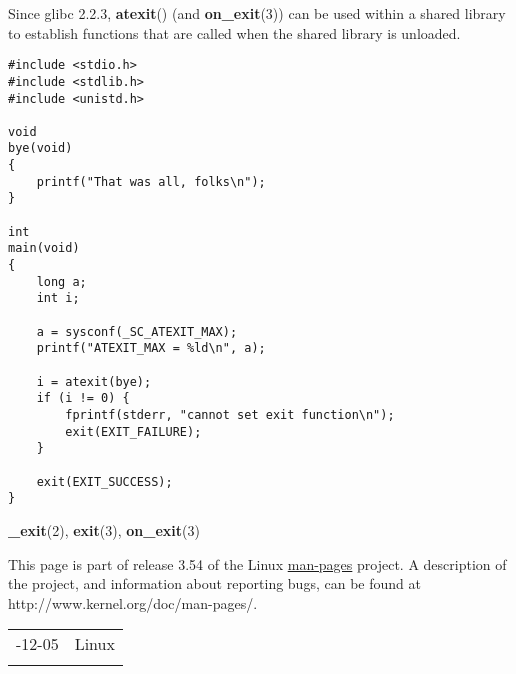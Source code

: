 \documentclass[]{article}
\let\realtextbf=\textbf
\renewcommand{\textbf}[1]{\textcolor{boldcolor}{\realtextbf{#1}}}
\renewcommand{\emph}[1]{\underline{#1}}
\begin{document}
Since glibc 2.2.3, \textbf{atexit}() (and \textbf{on\_exit}(3)) can be
used within a shared library to establish functions that are called when
the shared library is unloaded.


\begin{verbatim}
#include <stdio.h>
#include <stdlib.h>
#include <unistd.h>

void
bye(void)
{
    printf("That was all, folks\n");
}

int
main(void)
{
    long a;
    int i;

    a = sysconf(_SC_ATEXIT_MAX);
    printf("ATEXIT_MAX = %ld\n", a);

    i = atexit(bye);
    if (i != 0) {
        fprintf(stderr, "cannot set exit function\n");
        exit(EXIT_FAILURE);
    }

    exit(EXIT_SUCCESS);
}
\end{verbatim}


\textbf{\_exit}(2), \textbf{exit}(3), \textbf{on\_exit}(3)


This page is part of release 3.54 of the Linux \emph{man-pages} project.
A description of the project, and information about reporting bugs, can
be found at http://www.kernel.org/doc/man-pages/.

\begin{longtable}[c]{@{}ll@{}}
\toprule\addlinespace
2008-12-05 & Linux
\\\addlinespace
\bottomrule
\end{longtable}
\end{document}
